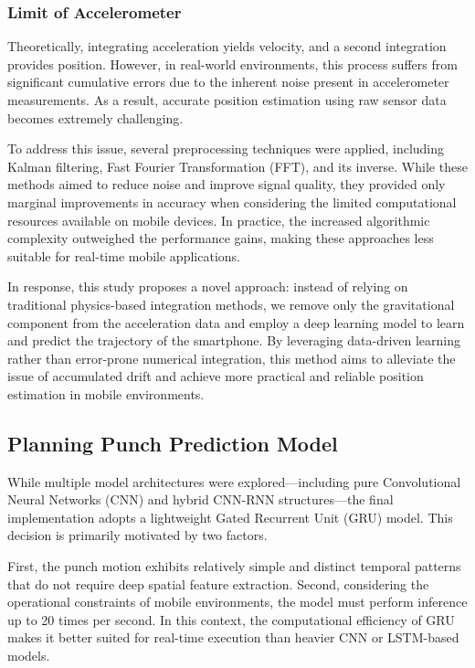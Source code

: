 \documentclass{article}
\begin{document}
    \FloatBarrier
    \subsubsection{Limit of Accelerometer}
    Theoretically, integrating acceleration yields velocity, and a second
    integration provides position. However, in real-world environments, this process
    suffers from significant cumulative errors due to the inherent noise present
    in accelerometer measurements. As a result, accurate position estimation using
    raw sensor data becomes extremely challenging.

    To address this issue, several preprocessing techniques were applied, including
    Kalman filtering, Fast Fourier Transformation (FFT), and its inverse. While
    these methods aimed to reduce noise and improve signal quality, they provided
    only marginal improvements in accuracy when considering the limited computational
    resources available on mobile devices. In practice, the increased algorithmic
    complexity outweighed the performance gains, making these approaches less
    suitable for real-time mobile applications.

    In response, this study proposes a novel approach: instead of relying on
    traditional physics-based integration methods, we remove only the gravitational
    component from the acceleration data and employ a deep learning model to learn
    and predict the trajectory of the smartphone. By leveraging data-driven
    learning rather than error-prone numerical integration, this method aims to alleviate
    the issue of accumulated drift and achieve more practical and reliable position
    estimation in mobile environments.

    \subsection{Planning Punch Prediction Model}

    While multiple model architectures were explored—including pure
    Convolutional Neural Networks (CNN) and hybrid CNN-RNN structures—the final
    implementation adopts a lightweight Gated Recurrent Unit (GRU) model. This decision
    is primarily motivated by two factors.

    First, the punch motion exhibits relatively simple and distinct temporal
    patterns that do not require deep spatial feature extraction. Second,
    considering the operational constraints of mobile environments, the model must
    perform inference up to 20 times per second. In this context, the computational
    efficiency of GRU makes it better suited for real-time execution than heavier
    CNN or LSTM-based models.
\end{document}
